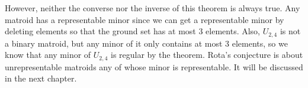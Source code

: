 However, neither the converse nor the inverse of this theorem is always true.
Any matroid has a representable minor since we can get a representable minor by deleting elements so that the ground set has at most 3 elements.
Also, $U_{2, 4}$ is not a binary matroid, but any minor of it only contains at most 3 elements, so we know that any minor of $U_{2,4}$ is regular by the theorem.
Rota's conjecture is about unrepresentable matroids any of whose minor is representable.
It will be discussed in the next chapter.


